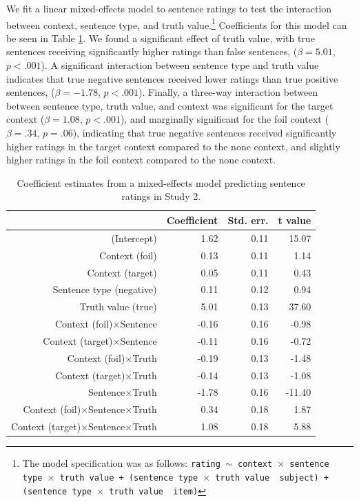 \documentclass[10pt,letterpaper]{article}
\begin{document}
We fit a linear mixed-effects model to sentence ratings to test the interaction between context, sentence type, and truth value.\footnote{ The model specification was as follows: \texttt{rating $\sim$ context~$\times$~sentence type~$\times$~truth value + (sentence type~$\times$~truth value~\textbar~subject) +  (sentence type~$\times$~truth value~\textbar~item)}}  Coefficients for this model can be seen in Table \ref{tab:s2}.  We found a significant effect of truth value, with true sentences receiving significantly higher ratings than false sentences, ($\beta= 5.01$, $p< .001$).  A significant interaction between sentence type and truth value indicates that true negative sentences received lower ratings than true positive sentences, ($\beta= -1.78$, $p< .001$).  Finally, a three-way interaction between between sentence type, truth value, and context was significant for the target context ($\beta= 1.08$, $p< .001$), and marginally significant for the foil context ($\beta= .34$, $p=.06$), indicating that true negative sentences received significantly higher ratings in the target context compared to the none context, and slightly higher ratings in the foil context compared to the none context.  


\begin{table}[t]
\caption{\label{tab:s2} Coefficient estimates from a mixed-effects model predicting sentence ratings in Study 2.}
\begin{center}
\small\addtolength{\tabcolsep}{-5pt}
\begin{tabular}{rrrr}
  \hline
 & Coefficient & Std. err. & t value \\ 
  \hline
(Intercept) & 1.62 & 0.11 & 15.07 \\ 
  Context (foil) & 0.13 & 0.11 & 1.14  \\ 
  Context (target) & 0.05 & 0.11 & 0.43  \\ 
  Sentence type (negative) & 0.11 & 0.12 & 0.94 \\
  Truth value (true) & 5.01 & 0.13 & 37.60 \\ 
  Context (foil)$\times$Sentence & -0.16 & 0.16 & -0.98 \\
  Context (target)$\times$Sentence & -0.11 & 0.16 & -0.72 \\
  Context (foil)$\times$Truth & -0.19 & 0.13 & -1.48 \\
  Context (target)$\times$Truth & -0.14 & 0.13 & -1.08 \\
  Sentence$\times$Truth & -1.78 & 0.16 & -11.40 \\
  Context (foil)$\times$Sentence$\times$Truth& 0.34 & 0.18 & 1.87 \\
  Context (target)$\times$Sentence$\times$Truth & 1.08 & 0.18 & 5.88 \\
   \hline
\end{tabular}
\vspace{-1.5cm}
\end{center}
\end{table}
\end{document}
